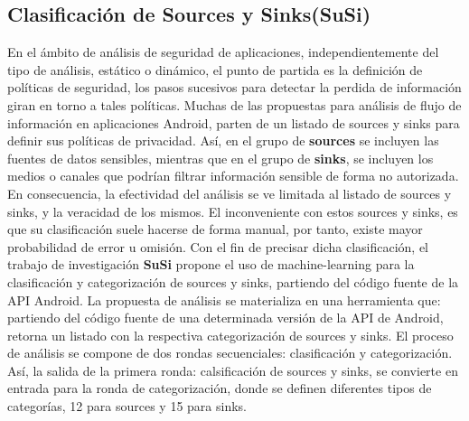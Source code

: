 \subsection{Clasificación de Sources y Sinks(SuSi)}
\label{sec:susi}
En el ámbito de análisis de seguridad de aplicaciones, independientemente del
tipo de análisis, estático o dinámico, el punto de partida es la definición de
políticas de seguridad, los pasos sucesivos para detectar la perdida de
información giran en torno a tales políticas.\newline
Muchas de las propuestas para análisis de flujo de información en aplicaciones
Android, parten de un listado de sources y sinks para definir sus políticas de
privacidad. Así, en el grupo de \textbf{sources} se incluyen las fuentes de
datos sensibles, mientras que en el grupo de \textbf{sinks}, se incluyen los
medios o canales que podrían filtrar información sensible de forma no autorizada. 
En consecuencia, la efectividad del análisis se ve limitada al listado de
sources y sinks, y la veracidad de los mismos. El inconveniente con estos sources y sinks, es que su
clasificación suele hacerse de forma manual, por tanto, existe mayor
probabilidad de error u omisión.\newline
Con el fin de precisar dicha clasificación, el trabajo de investigación
\textbf{SuSi} propone el uso de machine-learning para la clasificación y
categorización de sources y sinks, partiendo del código fuente de la API Android.
La propuesta de análisis se materializa en una herramienta que: partiendo del
código fuente de una determinada versión de la API de Android, retorna un
listado con la respectiva categorización de sources y sinks.\newline
El proceso de análisis se compone de dos rondas secuenciales: clasificación y
categorización.\newline
Así, la salida de la primera ronda: calsificación de sources y sinks, se
convierte en entrada para la ronda de categorización, donde se definen
diferentes tipos de categorías, 12 para sources y 15 para sinks.

